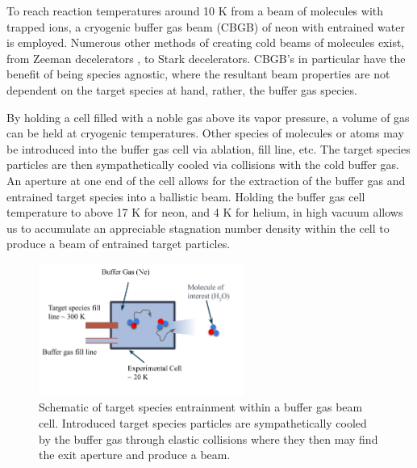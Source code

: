 To reach reaction temperatures around 10 K from a beam of molecules with trapped ions, a cryogenic buffer gas beam (CBGB) of neon with entrained water is employed. Numerous other methods of creating cold beams of molecules exist, from Zeeman decelerators \cite{Narevicius2008}, to Stark decelerators. CBGB's in particular have the benefit of being species agnostic, where the resultant beam properties are not dependent on the target species at hand, rather, the buffer gas species. 

By holding a cell filled with a noble gas above its vapor pressure, a volume of gas can be held at cryogenic temperatures. Other species of molecules or atoms may be introduced into the buffer gas cell via ablation, fill line, etc. The target species particles are then sympathetically cooled via collisions with the cold buffer gas. An aperture at one end of the cell allows for the extraction of the buffer gas and entrained target species into a ballistic beam. Holding the buffer gas cell temperature to above 17 K for neon, and 4 K for helium, in high vacuum allows us to accumulate an appreciable stagnation number density within the cell to produce a beam of entrained target particles.

\begin{figure}[H]
	\centering
	\includegraphics[width=0.6\textwidth]{images/CBGB_diagram.png}
	\caption{Schematic of target species entrainment within a buffer gas beam cell. Introduced target species particles are sympathetically cooled by the buffer gas through elastic collisions where they then may find the exit aperture and produce a beam.}
\end{figure}

